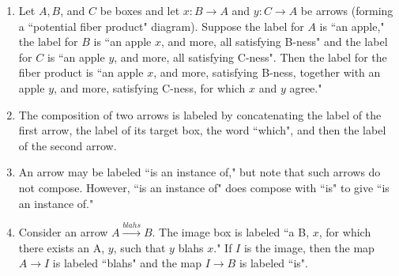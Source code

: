 \documentclass{amsart}
\def\to{\rightarrow}
\def\To{\xrightarrow}
\def\taking{\colon}
\begin{document}
\begin{enumerate}
\item Let $A, B$, and $C$ be boxes and let $x\taking B\to A$ and $y\taking C\to A$ be arrows (forming a ``potential fiber product" diagram).  Suppose the label for $A$ is ``an apple," the label for $B$ is ``an apple $x$, and more, all satisfying B-ness" and the label for $C$ is ``an apple $y$, and more, all satisfying C-ness".  Then the label for the fiber product is ``an apple $x$, and more, satisfying B-ness, together with an apple $y$, and more, satisfying C-ness, for which $x$ and $y$ agree."  

\item The composition of two arrows is labeled by concatenating the label of the first arrow, the label of its target box, the word ``which", and then the label of the second arrow.

\item An arrow may be labeled ``is an instance of," but note that such arrows do not compose.  However, ``is an instance of" does compose with ``is" to give ``is an instance of." 

\item Consider an arrow $A\To{blahs}B$.  The image box is labeled ``a B, $x$, for which there exists an A, $y$, such that $y$ blahs $x$."  If $I$ is the image, then the map $A\to I$ is labeled ``blahs" and the map $I\to B$ is labeled ``is".

\end{enumerate}
\end{document}

